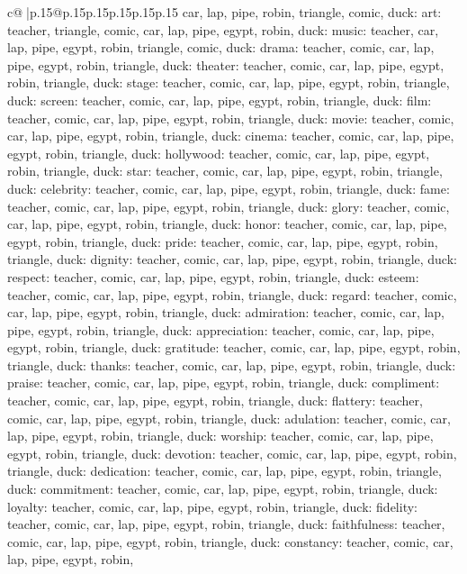 \documentclass{article}
\begin{document}
{\begin{supertabular}{c@{$\;$}|p{.15\linewidth}@{}p{.15\linewidth}p{.15\linewidth}p{.15\linewidth}p{.15\linewidth}p{.15\linewidth}}
{{{car, lap, pipe, robin, triangle, comic, duck\n\nCLUE: art\nTARGETS: teacher, triangle, comic, car, lap, pipe, egypt, robin, duck\n\nCLUE: music\nTARGETS: teacher, car, lap, pipe, egypt, robin, triangle, comic, duck\n\nCLUE: drama\nTARGETS: teacher, comic, car, lap, pipe, egypt, robin, triangle, duck\n\nCLUE: theater\nTARGETS: teacher, comic, car, lap, pipe, egypt, robin, triangle, duck\n\nCLUE: stage\nTARGETS: teacher, comic, car, lap, pipe, egypt, robin, triangle, duck\n\nCLUE: screen\nTARGETS: teacher, comic, car, lap, pipe, egypt, robin, triangle, duck\n\nCLUE: film\nTARGETS: teacher, comic, car, lap, pipe, egypt, robin, triangle, duck\n\nCLUE: movie\nTARGETS: teacher, comic, car, lap, pipe, egypt, robin, triangle, duck\n\nCLUE: cinema\nTARGETS: teacher, comic, car, lap, pipe, egypt, robin, triangle, duck\n\nCLUE: hollywood\nTARGETS: teacher, comic, car, lap, pipe, egypt, robin, triangle, duck\n\nCLUE: star\nTARGETS: teacher, comic, car, lap, pipe, egypt, robin, triangle, duck\n\nCLUE: celebrity\nTARGETS: teacher, comic, car, lap, pipe, egypt, robin, triangle, duck\n\nCLUE: fame\nTARGETS: teacher, comic, car, lap, pipe, egypt, robin, triangle, duck\n\nCLUE: glory\nTARGETS: teacher, comic, car, lap, pipe, egypt, robin, triangle, duck\n\nCLUE: honor\nTARGETS: teacher, comic, car, lap, pipe, egypt, robin, triangle, duck\n\nCLUE: pride\nTARGETS: teacher, comic, car, lap, pipe, egypt, robin, triangle, duck\n\nCLUE: dignity\nTARGETS: teacher, comic, car, lap, pipe, egypt, robin, triangle, duck\n\nCLUE: respect\nTARGETS: teacher, comic, car, lap, pipe, egypt, robin, triangle, duck\n\nCLUE: esteem\nTARGETS: teacher, comic, car, lap, pipe, egypt, robin, triangle, duck\n\nCLUE: regard\nTARGETS: teacher, comic, car, lap, pipe, egypt, robin, triangle, duck\n\nCLUE: admiration\nTARGETS: teacher, comic, car, lap, pipe, egypt, robin, triangle, duck\n\nCLUE: appreciation\nTARGETS: teacher, comic, car, lap, pipe, egypt, robin, triangle, duck\n\nCLUE: gratitude\nTARGETS: teacher, comic, car, lap, pipe, egypt, robin, triangle, duck\n\nCLUE: thanks\nTARGETS: teacher, comic, car, lap, pipe, egypt, robin, triangle, duck\n\nCLUE: praise\nTARGETS: teacher, comic, car, lap, pipe, egypt, robin, triangle, duck\n\nCLUE: compliment\nTARGETS: teacher, comic, car, lap, pipe, egypt, robin, triangle, duck\n\nCLUE: flattery\nTARGETS: teacher, comic, car, lap, pipe, egypt, robin, triangle, duck\n\nCLUE: adulation\nTARGETS: teacher, comic, car, lap, pipe, egypt, robin, triangle, duck\n\nCLUE: worship\nTARGETS: teacher, comic, car, lap, pipe, egypt, robin, triangle, duck\n\nCLUE: devotion\nTARGETS: teacher, comic, car, lap, pipe, egypt, robin, triangle, duck\n\nCLUE: dedication\nTARGETS: teacher, comic, car, lap, pipe, egypt, robin, triangle, duck\n\nCLUE: commitment\nTARGETS: teacher, comic, car, lap, pipe, egypt, robin, triangle, duck\n\nCLUE: loyalty\nTARGETS: teacher, comic, car, lap, pipe, egypt, robin, triangle, duck\n\nCLUE: fidelity\nTARGETS: teacher, comic, car, lap, pipe, egypt, robin, triangle, duck\n\nCLUE: faithfulness\nTARGETS: teacher, comic, car, lap, pipe, egypt, robin, triangle, duck\n\nCLUE: constancy\nTARGETS: teacher, comic, car, lap, pipe, egypt, robin, }}}
\end{supertabular}}
\end{document}
